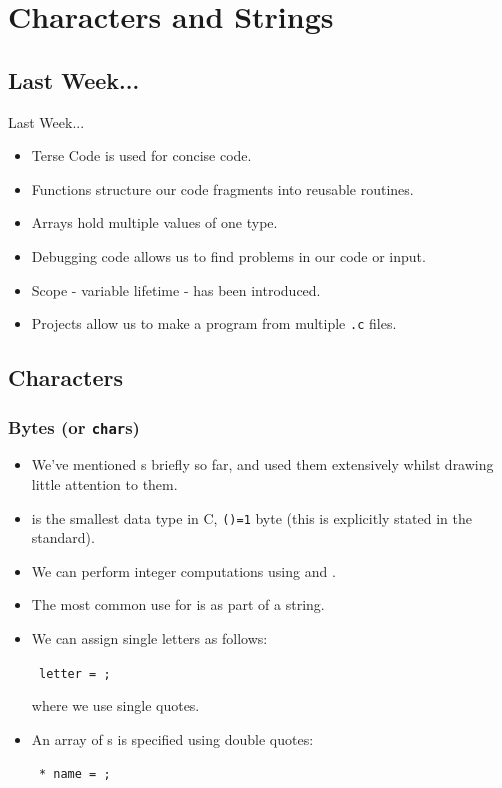 \documentclass[smaller,handout,table]{beamer}
\subtitle{Lecture 3 of 5}
\begin{document}
{
\begin{frame}
  \titlepage
\end{frame}
}


\section{Characters and Strings}
\subsection{Last Week...}
\begin{frame}{Last Week...}
\begin{itemize}
\item Terse Code is used for concise code.
\item Functions structure our code fragments into reusable routines.
\item Arrays hold multiple values of one type.
\item Debugging code allows us to find problems in our code or input.
\item Scope - variable lifetime - has been introduced.
\item Projects allow us to make a program from multiple \texttt{.c} files.
\end{itemize}
\end{frame}


\subsection{Characters}
\begin{frame}
\frametitle{Bytes (or {\tt char}s)}
\begin{itemize}
\item We've mentioned {\tt {}}s briefly so far, and used them extensively whilst drawing little attention to them.
\item {\tt {}} is the smallest data type in C, {\tt {}()=1} byte (this is explicitly stated in the standard).
\item We can perform integer computations using {\tt {}} and {\tt {}}.
\item The most common use for {\tt {}} is as part of a string.
\item We can assign single letters as follows:
\begin{center}
{\tt {} letter = ;}
\end{center}
where we use single quotes.
\item An array of {\tt {}}s is specified using double quotes:
\begin{center}
\tt {} * name = ;
\end{center}
\end{itemize}
\end{frame}
\end{document}
